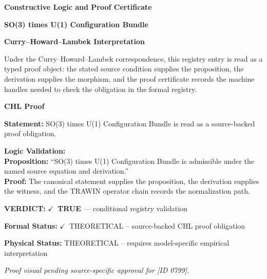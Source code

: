 \clearpage
\begingroup\tzpsupportsetup
\noindent\textbf{\fontsize{10.8pt}{12.8pt}\selectfont [ID 0799] Constructive Logic and Proof Certificate}\par
\noindent\textbf{\fontsize{10pt}{12pt}\selectfont SO(3) times U(1) Configuration Bundle}\par
\vspace{0.45em}
\begingroup
\footnotesize
\setlength{\parskip}{0.22em}
\setlength{\parindent}{0pt}
\noindent\textbf{Curry--Howard--Lambek Interpretation}\par
Under the Curry--Howard--Lambek correspondence, this registry entry is read as a typed proof
object: the stated source condition supplies the proposition, the derivation supplies the
morphism, and the proof certificate records the machine handles needed to check the obligation
in the formal registry.

\vspace{0.45em}
\noindent\textbf{CHL Proof}\par
\textbf{Statement:} SO(3) times U(1) Configuration Bundle is read as a source-backed proof obligation.

\textbf{Logic Validation:}\\
\textbf{Proposition:} ``SO(3) times U(1) Configuration Bundle is admissible under the named source equation and derivation.''\\
\textbf{Proof:} The canonical statement supplies the proposition, the derivation supplies the witness, and the TRAWIN operator chain records the normalization path.

\textbf{VERDICT:} \ensuremath{\checkmark}\ \textbf{TRUE} --- conditional registry validation

\textbf{Formal Status:} \ensuremath{\checkmark}\ THEORETICAL -- source-backed CHL proof obligation

\textbf{Physical Status:} THEORETICAL -- requires model-specific empirical interpretation
\par\vspace{0.45em}
\par
\vfill
\begingroup\footnotesize\itshape
Proof visual pending source-specific approval for [ID 0799].
\par\endgroup
\vfill
\endgroup
\endgroup
